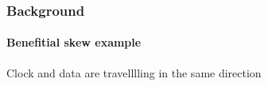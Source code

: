 \documentclass{beamer}
\begin{document}
\begin{frame}[c]
  \frametitle{Background}
  \framesubtitle{Benefitial skew example}
  Clock and data are travelllling in the same direction
\end{frame}
\end{document}
